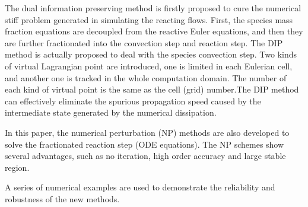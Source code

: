 \documentclass[review]{elsarticle}
\theoremstyle{plain}\newtheorem{definition}{\sc{Definition}}
\theoremstyle{defination}\newtheorem{example}{Example}[section]
\numberwithin{equation}{section}
\numberwithin{table}{section}
\begin{document}
{The dual information preserving method is firstly proposed to cure the numerical stiff problem generated in simulating the reacting flows. First, the species mass fraction equations are decoupled from the reactive Euler equations, and then they are further fractionated into the convection step and reaction step. The DIP method is actually proposed to deal with the species convection step. Two kinds of virtual Lagrangian point are introduced, one is limited in each Eulerian cell, and another one is tracked in the whole computation domain. The number of each kind of virtual point is the same as the cell (grid) number.The DIP method can effectively eliminate the spurious propagation speed caused by the intermediate state generated by the numerical dissipation.

In this paper, the numerical perturbation (NP) methods are also developed to solve the fractionated reaction step (ODE equations). The NP schemes show several advantages, such as no iteration, high order accuracy and large stable region.  

A series of numerical examples are used to demonstrate the reliability and robustness of the new methods.

%


}
\end{document}
